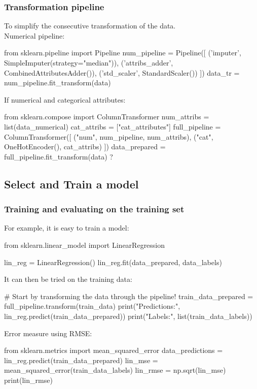     \subsubsection*{Transformation pipeline}
    To simplify the consecutive transformation of the data.\\
    Numerical pipeline:
    \begin{python}
      from sklearn.pipeline import Pipeline
      num_pipeline = Pipeline([
                  ('imputer', SimpleImputer(strategy="median")),
                  ('attribs_adder', CombinedAttributesAdder()),
                  ('std_scaler', StandardScaler())
                  ])
      data_tr = num_pipeline.fit_transform(data)
    \end{python}
    If numerical and categorical attributes:
    \begin{python}
      from sklearn.compose import ColumnTransformer
      num_attribs = list(data_numerical)
      cat_attribs = ["cat_attributes"]
      full_pipeline = ColumnTransformer([
            ("num", num_pipeline, num_attribs),
            ("cat", OneHotEncoder(), cat_attribs)
            ])
      data_prepared = full_pipeline.fit_transform(data)
    ?\end{python}

\subsection{Select and Train a model}
\subsubsection*{Training and evaluating on the training set}
    For example, it is easy to train a model:
    \begin{python}
        from sklearn.linear_model import LinearRegression

        lin_reg = LinearRegression()
        lin_reg.fit(data_prepared, data_labels)
    \end{python}

    It can then be tried on the training data:
    \begin{python}
        # Start by transforming the data through the pipeline!
        train_data_prepared = full_pipeline.transform(train_data)
        print("Predictions:", lin_reg.predict(train_data_prepared))
        print("Labels:", list(train_data_labels))
    \end{python}

    Error measure using RMSE:
    \begin{python}
        from sklearn.metrics import mean_squared_error
        data_predictions = lin_reg.predict(train_data_prepared)
        lin_mse = mean_squared_error(train_data_labels)
        lin_rmse = np.sqrt(lin_mse)
        print(lin_rmse)
    \end{python}

